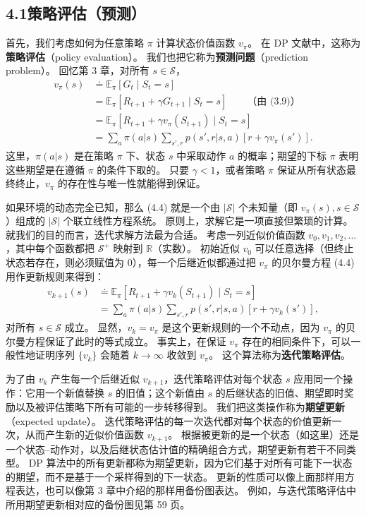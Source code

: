 \documentclass[UTF8, 12pt, fontset=fandol, oneside]{ctexart}
\begin{document}
\subsection*{4.1\quad 策略评估（预测）}

首先，我们考虑如何为任意策略 $\pi$ 计算状态价值函数 $v_\pi$。
在 DP 文献中，这称为\textbf{策略评估}（policy evaluation）。
我们也把它称为\textbf{预测问题}（prediction problem）。
回忆第 3 章，对所有 $s\in\mathcal{S}$，
\begin{align}
v_\pi(s)
&\doteq \mathbb{E}_\pi[G_t\mid S_t=s] \\
&= \mathbb{E}_\pi[R_{t+1}+\gamma G_{t+1}\mid S_t=s] \qquad \text{（由 (3.9)）}\\
&= \mathbb{E}_\pi[R_{t+1}+\gamma v_\pi(S_{t+1})\mid S_t=s] \tag{4.3}\\
&= \sum_a \pi(a|s)\sum_{s',r}p(s',r|s,a)\left[r+\gamma v_\pi(s')\right].
\tag{4.4}
\end{align}
这里，$\pi(a|s)$ 是在策略 $\pi$ 下、状态 $s$ 中采取动作 $a$ 的概率；期望的下标 $\pi$ 表明这些期望是在遵循 $\pi$ 的条件下取的。
只要 $\gamma<1$，或者策略 $\pi$ 保证从所有状态最终终止，$v_\pi$ 的存在性与唯一性就能得到保证。

如果环境的动态完全已知，那么 (4.4) 就是一个由 $|\mathcal{S}|$ 个未知量（即 $v_\pi(s),s\in\mathcal{S}$）组成的 $|\mathcal{S}|$ 个联立线性方程系统。
原则上，求解它是一项直接但繁琐的计算。
就我们的目的而言，迭代求解方法最为合适。
考虑一列近似价值函数 $v_0,v_1,v_2,\ldots$，其中每个函数都把 $\mathcal{S}^+$ 映射到 $\mathbb{R}$（实数）。
初始近似 $v_0$ 可以任意选择（但终止状态若存在，则必须赋值为 $0$），每一个后继近似都通过把 $v_\pi$ 的贝尔曼方程 (4.4) 用作更新规则来得到：
\begin{equation}
\begin{aligned}
v_{k+1}(s)
&\doteq \mathbb{E}_\pi[R_{t+1}+\gamma v_k(S_{t+1})\mid S_t=s] \\
&= \sum_a \pi(a|s)\sum_{s',r}p(s',r|s,a)\left[r+\gamma v_k(s')\right],
\end{aligned}
\tag{4.5}
\end{equation}
对所有 $s\in\mathcal{S}$ 成立。
显然，$v_k=v_\pi$ 是这个更新规则的一个不动点，因为 $v_\pi$ 的贝尔曼方程保证了此时的等式成立。
事实上，在保证 $v_\pi$ 存在的相同条件下，可以一般性地证明序列 $\{v_k\}$ 会随着 $k\to\infty$ 收敛到 $v_\pi$。
这个算法称为\textbf{迭代策略评估}。

为了由 $v_k$ 产生每一个后继近似 $v_{k+1}$，迭代策略评估对每个状态 $s$ 应用同一个操作：它用一个新值替换 $s$ 的旧值；这个新值由 $s$ 的后继状态的旧值、期望即时奖励以及被评估策略下所有可能的一步转移得到。
我们把这类操作称为\textbf{期望更新}（expected update）。
迭代策略评估的每一次迭代都对每个状态的价值更新一次，从而产生新的近似价值函数 $v_{k+1}$。
根据被更新的是一个状态（如这里）还是一个状态--动作对，以及后继状态估计值的精确组合方式，期望更新有若干不同类型。
DP 算法中的所有更新都称为期望更新，因为它们基于对所有可能下一状态的期望，而不是基于一个采样得到的下一状态。
更新的性质可以像上面那样用方程表达，也可以像第 3 章中介绍的那样用备份图表达。
例如，与迭代策略评估中所用期望更新相对应的备份图见第 59 页。
\end{document}
